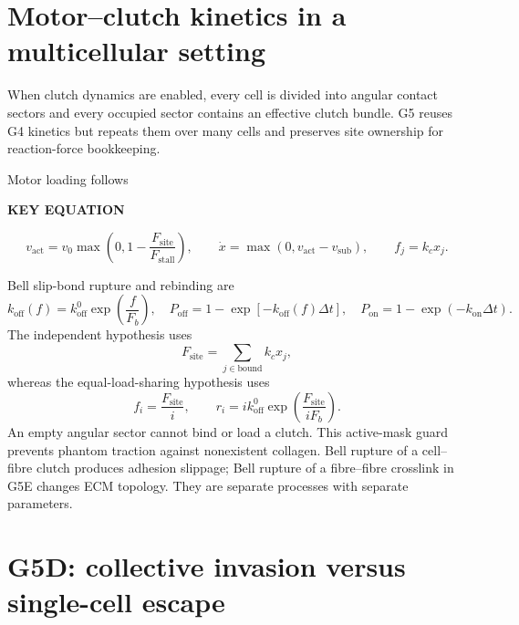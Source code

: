 \documentclass[10.5pt]{article}
\newcommand{\keylabel}{\par\smallskip\noindent\textcolor{g5}{\textbf{KEY EQUATION}}\par\vspace{-5pt}}
\begin{document}
\section{Motor--clutch kinetics in a multicellular setting}

When clutch dynamics are enabled, every cell is divided into angular contact sectors and every
occupied sector contains an effective clutch bundle. G5 reuses G4 kinetics but repeats them over
many cells and preserves site ownership for reaction-force bookkeeping.

Motor loading follows
\keylabel
\begin{equation}
 v_{\mathrm{act}}=v_0\max\!\left(0,1-\frac{F_{\mathrm{site}}}{F_{\mathrm{stall}}}\right),
 \qquad
 \dot x=\max(0,v_{\mathrm{act}}-v_{\mathrm{sub}}),
 \qquad f_j=k_cx_j.
 \label{eq:motor}
\end{equation}

Bell slip-bond rupture and rebinding are
\begin{equation}
 k_{\mathrm{off}}(f)=k_{\mathrm{off}}^0\exp\!\left(\frac{f}{F_b}\right),
 \quad P_{\mathrm{off}}=1-\exp[-k_{\mathrm{off}}(f)\Delta t],
 \quad P_{\mathrm{on}}=1-\exp(-k_{\mathrm{on}}\Delta t).
 \label{eq:bell}
\end{equation}
The independent hypothesis uses
\begin{equation}
 F_{\mathrm{site}}=\sum_{j\in\mathrm{bound}}k_cx_j,
 \label{eq:independent}
\end{equation}
whereas the equal-load-sharing hypothesis uses
\begin{equation}
 f_i=\frac{F_{\mathrm{site}}}{i},\qquad
 r_i=i k_{\mathrm{off}}^0\exp\!\left(\frac{F_{\mathrm{site}}}{iF_b}\right).
 \label{eq:shared}
\end{equation}
An empty angular sector cannot bind or load a clutch. This active-mask guard prevents phantom
traction against nonexistent collagen. Bell rupture of a cell--fibre clutch produces adhesion
slippage; Bell rupture of a fibre--fibre crosslink in G5E changes ECM topology. They are separate
processes with separate parameters.

\section{G5D: collective invasion versus single-cell escape}
\end{document}
